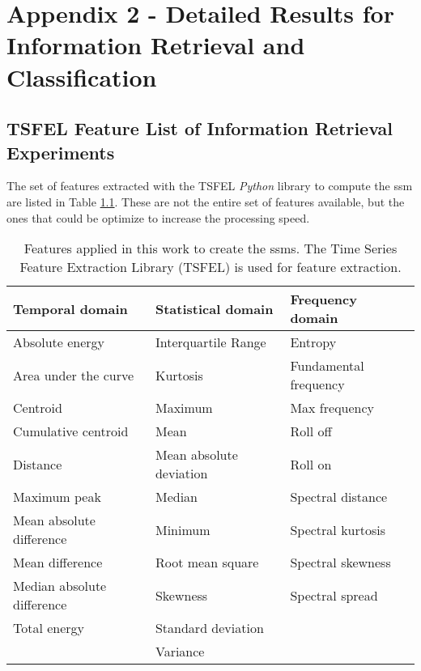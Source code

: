 
%

\chapter{Appendix 2 - Detailed Results for Information Retrieval and Classification}
\label{appendix:tables_detailed}

\section{TSFEL Feature List of Information Retrieval Experiments}
\label{app:tsfel}

The set of features extracted with the TSFEL \textit{Python} library to compute the \gls{ssm} are listed in Table \ref{tab:tsfel_featurelist}. These are not the entire set of features available, but the ones that could be optimize to increase the processing speed.  

\begin{table}[h]
    \centering
    \caption{Features applied in this work to create the \gls{ssm}s. The Time Series Feature Extraction Library (TSFEL) is used for feature extraction.}
    \begin{tabular}{l|l|l}
    \toprule
        \textbf{Temporal domain} &  \textbf{Statistical domain} & \textbf{Frequency domain}\\
    \midrule
        Absolute energy & Interquartile Range & Entropy\\
        Area under the curve & Kurtosis & Fundamental frequency\\
        Centroid & Maximum & Max frequency\\
        Cumulative centroid & Mean & Roll off\\
        Distance & Mean absolute deviation & Roll on \\
        Maximum peak & Median & Spectral distance\\
        Mean absolute difference & Minimum & Spectral kurtosis\\
        Mean difference & Root mean square & Spectral skewness\\
        Median absolute difference & Skewness & Spectral spread\\
        Total energy & Standard deviation & \\
         & Variance & \\
    \bottomrule
    \end{tabular}
    \label{tab:tsfel_featurelist}
\end{table}

